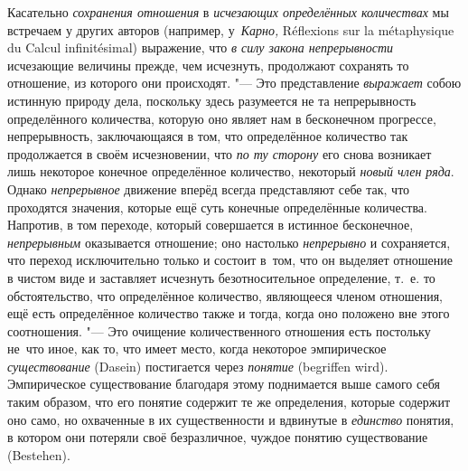 Касательно {\em сохранения отношения} в {\em исчезающих определённых
количествах} мы встречаем у других авторов (например, у~{\em Карно,}
Ré\-flexi\-ons sur la méta\-phy\-sique du Cal\-cul in\-fini\-tési\-mal)
выражение, что {\em в силу закона непрерывности} исчезающие величины прежде,
чем исчезнуть, продолжают сохранять то отношение, из которого они происходят.
"--- Это представление {\em выражает} собою истинную природу дела, поскольку
здесь разумеется не та непрерывность определённого количества, которую оно
являет нам в бесконечном прогрессе, непрерывность, заключающаяся в том, что
определённое количество так продолжается в своём исчезновении, что
{\em по ту сторону} его снова возникает лишь некоторое конечное определённое
количество, некоторый {\em новый член ряда}. Однако {\em непрерывное} движение
вперёд всегда представляют себе так, что проходятся значения, которые ещё суть
конечные определённые количества. Напротив, в том переходе, который совершается
в истинное бесконечное, {\em непрерывным} оказывается отношение; оно настолько
{\em непрерывно} и сохраняется, что переход исключительно только и состоит
в~том, что он выделяет отношение в чистом виде и заставляет исчезнуть
безотносительное определение, т.~е. то обстоятельство, что определённое
количество, являющееся членом отношения, ещё есть определённое количество также
и тогда, когда оно положено вне этого соотношения. "--- Это очищение
количественного отношения есть постольку не~что иное, как то, что имеет место,
когда некоторое эмпирическое {\em существование} (Dasein) постигается через
{\em понятие} (begriffen wird). Эмпирическое существование благодаря этому
поднимается выше самого себя таким образом, что его понятие содержит те же
определения, которые содержит оно само, но охваченные в их существенности и
вдвинутые в {\em единство} понятия, в котором они потеряли своё безразличное,
чуждое понятию существование (Bestehen).


